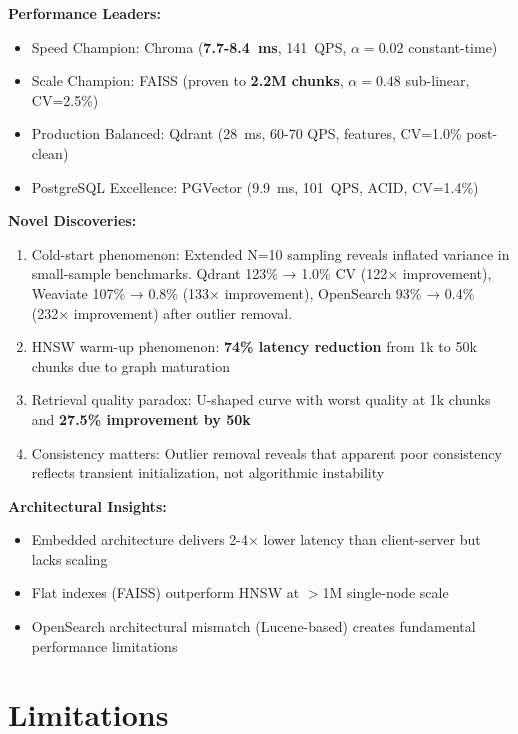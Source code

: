 \documentclass{article}
\begin{document}
\textbf{Performance Leaders:}
\begin{itemize}
    \item Speed Champion: Chroma (\textbf{7.7-8.4~ms}, 141~QPS, $\alpha=0.02$ constant-time)
    \item Scale Champion: FAISS (proven to \textbf{2.2M chunks}, $\alpha=0.48$ sub-linear, CV=2.5\%)
    \item Production Balanced: Qdrant (28~ms, 60-70 QPS, features, CV=1.0\% post-clean)
    \item PostgreSQL Excellence: PGVector (9.9~ms, 101~QPS, ACID, CV=1.4\%)
\end{itemize}

\textbf{Novel Discoveries:}
\begin{enumerate}
    \item Cold-start phenomenon: Extended N=10 sampling reveals inflated variance in small-sample benchmarks. Qdrant 123\% → 1.0\% CV (122× improvement), Weaviate 107\% → 0.8\% (133× improvement), OpenSearch 93\% → 0.4\% (232× improvement) after outlier removal.
    \item HNSW warm-up phenomenon: \textbf{74\% latency reduction} from 1k to 50k chunks due to graph maturation
    \item Retrieval quality paradox: U-shaped curve with worst quality at 1k chunks and \textbf{27.5\% improvement by 50k}
    \item Consistency matters: Outlier removal reveals that apparent poor consistency reflects transient initialization, not algorithmic instability
\end{enumerate}

\textbf{Architectural Insights:}
\begin{itemize}
    \item Embedded architecture delivers 2-4× lower latency than client-server but lacks scaling
    \item Flat indexes (FAISS) outperform HNSW at $>$1M single-node scale
    \item OpenSearch architectural mismatch (Lucene-based) creates fundamental performance limitations
\end{itemize}


\section{Limitations}
\label{sec:limitations}
\end{document}
